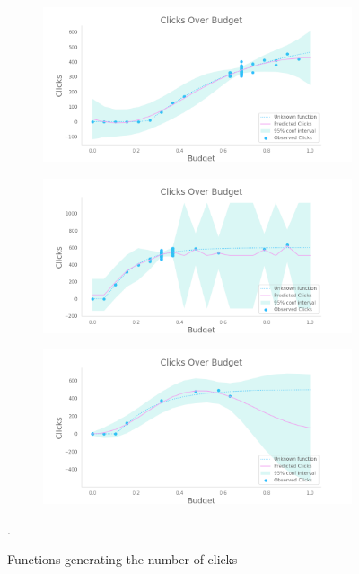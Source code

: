 \begin{figure}[!htb]
	\centering
	
	\begin{subfigure}[!H]{0.8\textwidth}
		\centering
		\includegraphics[width=\textwidth]{images/part2_bidding_curve_subcamaign_0.png}
	\end{subfigure}
	
	\begin{subfigure}[!H]{0.8\textwidth}
		\centering
		\includegraphics[width=\textwidth]{images/part2_bidding_curve_subcamaign_1.png}
	\end{subfigure}
	\begin{subfigure}[!H]{0.8\textwidth}
		\centering
		\includegraphics[width=\textwidth]{images/part2_bidding_curve_subcamaign_2.png}
	\end{subfigure}

	\caption{Functions generating the number of clicks}.
	\label{curve2Fig}
\end{figure}

